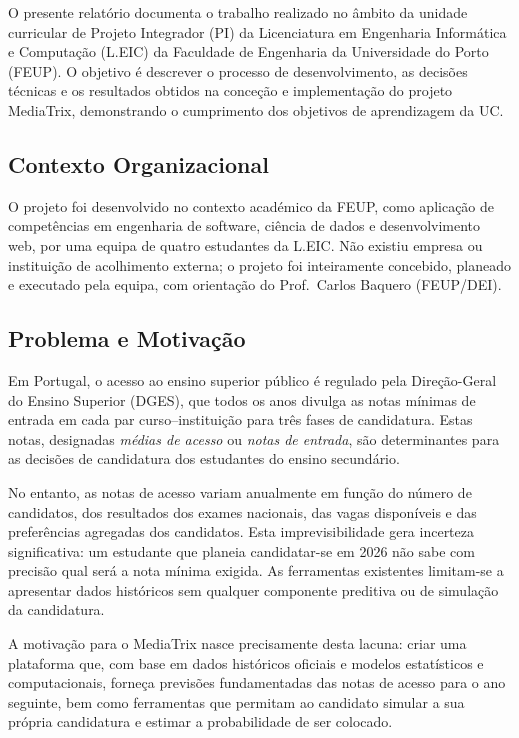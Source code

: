 \documentclass[12pt,a4paper]{article}
\begin{document}
O presente relatório documenta o trabalho realizado no âmbito da unidade curricular de Projeto Integrador (PI) da Licenciatura em Engenharia Informática e Computação (L.EIC) da Faculdade de Engenharia da Universidade do Porto (FEUP). O objetivo é descrever o processo de desenvolvimento, as decisões técnicas e os resultados obtidos na conceção e implementação do projeto MediaTrix, demonstrando o cumprimento dos objetivos de aprendizagem da UC.

\subsection{Contexto Organizacional}

O projeto foi desenvolvido no contexto académico da FEUP, como aplicação de competências em engenharia de software, ciência de dados e desenvolvimento web, por uma equipa de quatro estudantes da L.EIC. Não existiu empresa ou instituição de acolhimento externa; o projeto foi inteiramente concebido, planeado e executado pela equipa, com orientação do Prof.\ Carlos Baquero (FEUP/DEI).

\subsection{Problema e Motivação}

Em Portugal, o acesso ao ensino superior público é regulado pela Direção-Geral do Ensino Superior (DGES), que todos os anos divulga as notas mínimas de entrada em cada par curso--instituição para três fases de candidatura. Estas notas, designadas \textit{médias de acesso} ou \textit{notas de entrada}, são determinantes para as decisões de candidatura dos estudantes do ensino secundário.

No entanto, as notas de acesso variam anualmente em função do número de candidatos, dos resultados dos exames nacionais, das vagas disponíveis e das preferências agregadas dos candidatos. Esta imprevisibilidade gera incerteza significativa: um estudante que planeia candidatar-se em 2026 não sabe com precisão qual será a nota mínima exigida. As ferramentas existentes limitam-se a apresentar dados históricos sem qualquer componente preditiva ou de simulação da candidatura.

A motivação para o MediaTrix nasce precisamente desta lacuna: criar uma plataforma que, com base em dados históricos oficiais e modelos estatísticos e computacionais, forneça previsões fundamentadas das notas de acesso para o ano seguinte, bem como ferramentas que permitam ao candidato simular a sua própria candidatura e estimar a probabilidade de ser colocado.
\end{document}
